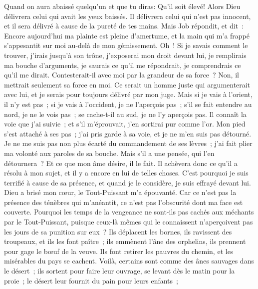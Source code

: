 \begin{multicols}{2}
Quand on aura abaissé quelqu'un et que tu diras: Qu'il soit élevé! Alors Dieu délivrera celui qui avait les yeux baissés.
Il délivrera celui qui n'est pas innocent, et il sera délivré à cause de la pureté de tes mains.
\VerseOne{}Mais Job répondit, et dit~:
Encore aujourd'hui ma plainte est pleine d'amertume, et la main qui m'a frappé s'appesantit sur moi au-delà de mon gémissement.
Oh~! Si je savais comment le trouver, j'irais jusqu'à son trône,
j'exposerai mon droit devant lui, je remplirais ma bouche d'arguments,
je saurais ce qu'il me répondrait, je comprendrais ce qu'il me dirait.
Contesterait-il avec moi par la grandeur de sa force~? Non, il mettrait seulement sa force en moi.
Ce serait un homme juste qui argumenterait avec lui, et je serais pour toujours délivré par mon juge.
Mais si je vais à l'orient, il n'y est pas~; si je vais à l'occident, je ne l'aperçois pas~;
s'il se fait entendre au nord, je ne le vois pas~; se cache-t-il au sud, je ne l'y aperçois pas.
Il connaît la voie que j'ai suivie~; et s'il m'éprouvait, j'en sortirai pur comme l'or.
Mon pied s'est attaché à ses pas~; j'ai pris garde à sa voie, et je ne m'en suis pas détourné.
Je ne me suis pas non plus écarté du commandement de ses lèvres~; j'ai fait plier ma volonté aux paroles de sa bouche.
Mais s'il a une pensée, qui l'en détournera~? Et ce que mon âme désire, il le fait.
Il achèvera donc ce qu'il a résolu à mon sujet, et il y a encore en lui de telles choses.
C'est pourquoi je suis terrifié à cause de sa présence, et quand je le considère, je suis effrayé devant lui.
Dieu a brisé mon cœur, le Tout-Puissant m'a épouvanté.
Car ce n'est pas la présence des ténèbres qui m'anéantit, ce n'est pas l'obscurité dont ma face est couverte.
\VerseOne{}Pourquoi les temps de la vengeance ne sont-ils pas cachés aux méchants par le Tout-Puissant, puisque ceux-là mêmes qui le connaissent n'aperçoivent pas les jours de sa punition sur eux~?
Ils déplacent les bornes, ils ravissent des troupeaux, et ils les font paître~;
ils emmènent l'âne des orphelins, ils prennent pour gage le bœuf de la veuve.
Ils font retirer les pauvres du chemin, et les misérables du pays se cachent.
Voilà, certains sont comme des ânes sauvages dans le désert~; ils sortent pour faire leur ouvrage, se levant dès le matin pour la proie~; le désert leur fournit du pain pour leurs enfants~;

\end{multicols}
